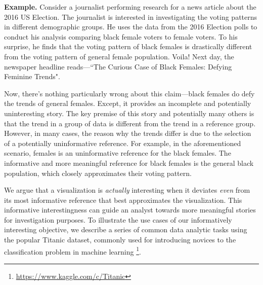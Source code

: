 \textbf{Example.} Consider a journalist performing research for a news article about the 2016 US Election. The journalist is interested in investigating the voting patterns in different demographic groups. He uses the data from the 2016 Election polls to conduct his analysis comparing black female voters to female voters. To his surprise, he finds that the voting pattern of black females is drastically different from the voting pattern of general female population. Voila! Next day, the newspaper headline reads---``The Curious Case of Black Females: Defying Feminine Trends". 

Now, there's nothing particularly wrong about this claim---black females do defy the trends of general females. Except, it provides an incomplete and potentially uninteresting story. The key premise of this story and potentially many others is that the trend in a group of data is different from the trend in a reference group. However, in many cases, the reason why the trends differ is due to the selection of a potentially uninformative reference. For example, in the aforementioned scenario, females is an uninformative reference for the black females. The informative and more meaningful reference for black females is the general black population, which closely approximates their voting pattern. 

We argue that a visualization is \emph{actually} interesting when it deviates \emph{even} from its most informative reference that best approximates the visualization. This informative interestingness can guide an analyst towards more meaningful stories for investigation purposes. To illustrate the use cases of our informatively interesting objective, we describe a series of common data analytic tasks using the popular Titanic dataset, commonly used for introducing novices to the classification problem in machine learning \footnote{\url{https://www.kaggle.com/c/Titanic}}.







